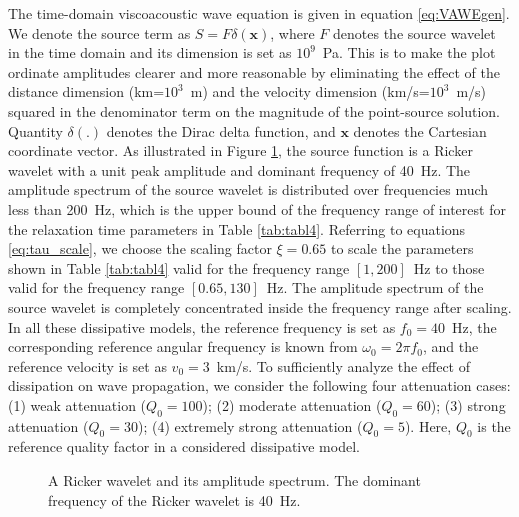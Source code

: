 \documentclass[article]{./macros/elsarticle_qh}
\begin{document}
The time-domain viscoacoustic wave equation is given in equation \ref{eq:VAWEgen}. We denote the source term as $S = F\delta(\mathbf{x})$, where $F$ denotes the source wavelet in the time domain and its dimension is set as $10^9$~Pa. This is to make the plot ordinate amplitudes clearer and more reasonable by eliminating the effect of the distance dimension (km=$10^3$~m) and the velocity dimension (km/s=$10^3$~m/s) squared in the denominator term on the magnitude of the point-source solution. Quantity $\delta(.)$ denotes the Dirac delta function, and $\mathbf{x}$ denotes the Cartesian coordinate vector. As illustrated in Figure \ref{fig:fig5}, the source function is a Ricker wavelet with a unit peak amplitude and dominant frequency of 40~Hz. The amplitude spectrum of the source wavelet is distributed over frequencies much less than 200~Hz, which is the upper bound of the frequency range of interest for the relaxation time parameters in Table \ref{tab:tabl4}. Referring to equations \ref{eq:tau_scale}, we choose the scaling factor $\xi = 0.65$ to scale the parameters shown in Table \ref{tab:tabl4} valid for the frequency range $[1, 200]$~Hz to those valid for the frequency range $[0.65, 130]$~Hz. The amplitude spectrum of the source wavelet is completely concentrated inside the frequency range after scaling. In all these dissipative models, the reference frequency is set as $f_{0} = 40$~Hz, the corresponding reference angular frequency is known from $\omega_{0} = 2\pi f_{0}$, and the reference velocity is set as $v_{0} = 3$~km/s. To sufficiently analyze the effect of dissipation on wave propagation, we consider the following four attenuation cases: (1) weak attenuation ($Q_{0}=100$); (2) moderate attenuation ($Q_{0}=60$); (3) strong attenuation ($Q_{0}=30$); (4) extremely strong attenuation ($Q_{0}=5$). Here, $Q_{0}$ is the reference quality factor in a considered dissipative model. 

\begin{figure}[H]
\centering
{}
\qquad
{}
\caption{
A Ricker wavelet and its amplitude spectrum. The dominant frequency of the Ricker wavelet is 40~Hz. 
}
\label{fig:fig5}
\end{figure}
\end{document}
